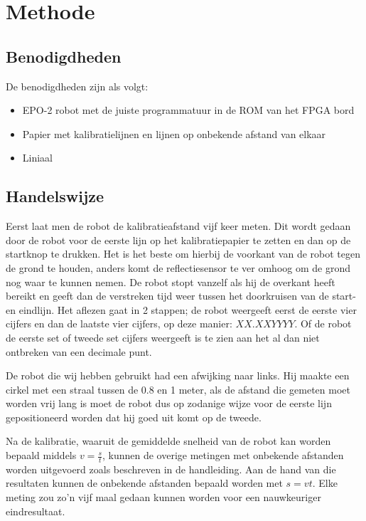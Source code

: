 \documentclass{thema}
\begin{document}
\chapter{Methode}
\section{Benodigdheden}
De benodigdheden zijn als volgt:
\begin{itemize}
\item EPO-2 robot met de juiste programmatuur in de ROM van het FPGA bord
\item Papier met kalibratielijnen en lijnen op onbekende afstand van elkaar
\item Liniaal
\end{itemize}
\section{Handelswijze}
Eerst laat men de robot de kalibratieafstand vijf keer meten. Dit wordt gedaan door de robot voor de eerste lijn op het kalibratiepapier te zetten en dan op de startknop te drukken. Het is het beste om hierbij de voorkant van de robot tegen de grond te houden, anders komt de reflectiesensor te ver omhoog om de grond nog waar te kunnen nemen. De robot stopt vanzelf als hij de overkant heeft bereikt en geeft dan de verstreken tijd weer tussen het doorkruisen van de start- en eindlijn. Het aflezen gaat in 2 stappen; de robot weergeeft eerst de eerste vier cijfers en dan de laatste vier cijfers, op deze manier: $XX.XXYYYY$. Of de robot de eerste set of tweede set cijfers weergeeft is te zien aan het al dan niet ontbreken van een decimale punt. 

De robot die wij hebben gebruikt had een afwijking naar links. Hij maakte een cirkel met een straal tussen de 0.8 en 1 meter, als de afstand die gemeten moet worden vrij lang is moet de robot dus op zodanige wijze voor de eerste lijn gepositioneerd worden dat hij goed uit komt op de tweede.

Na de kalibratie, waaruit de gemiddelde snelheid van de robot kan worden bepaald middels $v=\frac{s}{t}$, kunnen de overige metingen met onbekende afstanden worden uitgevoerd zoals beschreven in de handleiding. Aan de hand van die resultaten kunnen de onbekende afstanden bepaald worden met $s=vt$. Elke meting zou zo'n vijf maal gedaan kunnen worden voor een nauwkeuriger eindresultaat.
\end{document}
